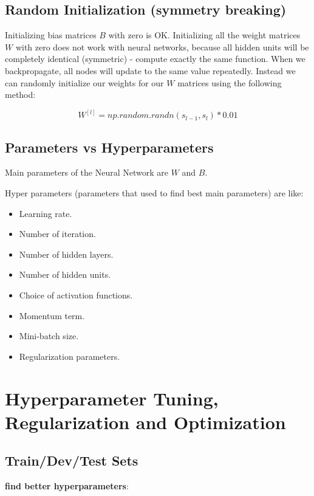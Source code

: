 \documentclass{article}
\begin{document}
\subsection{Random Initialization (symmetry breaking)}

\noindent Initializing bias matrices \(B\) with zero is OK. Initializing all the weight matrices \(W\) with zero does not work with neural networks, because all hidden units will be completely identical (symmetric) - compute exactly the same function. When we backpropagate, all nodes will update to the same value repeatedly. Instead we can randomly initialize our weights for our \(W\) matrices using the following method:

\[W^{[l]} = np.random.randn(s_{l - 1}, s_l) * 0.01 \]

\subsection{Parameters vs Hyperparameters}

\noindent Main parameters of the Neural Network are \(W\) and \(B\).

\noindent Hyper parameters (parameters that used to find best main parameters) are like:

\begin{itemize}
  \item Learning rate.
  \item Number of iteration.
  \item Number of hidden layers.
  \item Number of hidden units.
  \item Choice of activation functions.
  \item Momentum term.
  \item Mini-batch size.
  \item Regularization parameters.
\end{itemize}

\section{Hyperparameter Tuning, Regularization and Optimization}

\subsection{Train/Dev/Test Sets}

\noindent \textbf{find better hyperparameters}:
\end{document}
